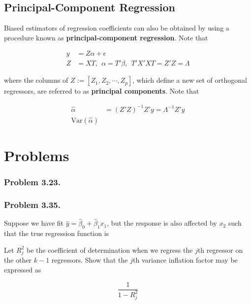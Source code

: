 \documentclass[12pt]{article}
\begin{document}
\subsection{Principal-Component Regression}

Biased estimators of regression coefficients can also be obtained by using a procedure known as \textbf{principal-component regression}. Note that 

$$
\begin{aligned}
y &=  Z \alpha + \epsilon \\[8pt]
Z &=  XT, \ \ \alpha = T'\beta, \ \ T'X'XT = Z'Z = \Lambda
\end{aligned}
$$

where the columns of $Z:= [Z_1, Z_2, \cdots, Z_p]$, which define a new set of orthogonal regressors, are referred to as \textbf{principal components}. Note that 

$$
\begin{aligned}
\hat{\alpha} &= (Z'Z)^{-1}Z'y = \Lambda^{-1}Z'y \\[8pt]
\mathrm{Var}(\hat{\alpha})
\end{aligned}
$$


\pagebreak

\section*{Problems}

\subsubsection*{Problem 3.23.}



\subsubsection*{Problem 3.35.} Suppose we have fit $\hat{y} = \hat{\beta}_0 + \hat{\beta}_1 x_1$, but the response is also affected by $x_2$ such that the true regression function is 


Let $R_j^2$ be the coefficient of determination when we regress the $j$th regressor on the other $k-1$ regressors. Show that the $j$th variance inflation factor may be expressed as 

$$
\frac{1}{1-R_j^2}
$$
\end{document}
